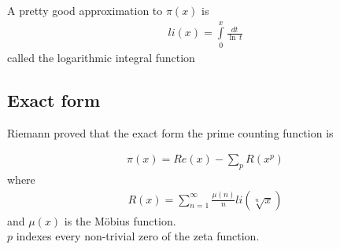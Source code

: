 \documentclass{article}
\begin{document}
A pretty good approximation to \(\pi(x)\) is
\begin{align*}
    li(x)=\int\limits_0^{x} \frac{dt}{\ln\,t}
\end{align*}
called the logarithmic integral function

\subsection{Exact form}

Riemann proved that the exact form the prime counting function is

\begin{align*}
    \pi(x)=Re(x)-\sum_{p}R(x^p)
\end{align*}
where
\begin{align*}
    R(x)=\sum_{n=1}^{\infty}\frac{\mu(n)}{n}li(\sqrt[n]{x})
\end{align*}
and \(\mu(x)\) is the Möbius function.\\
\(p\) indexes every non-trivial zero of the zeta function.
\end{document}
